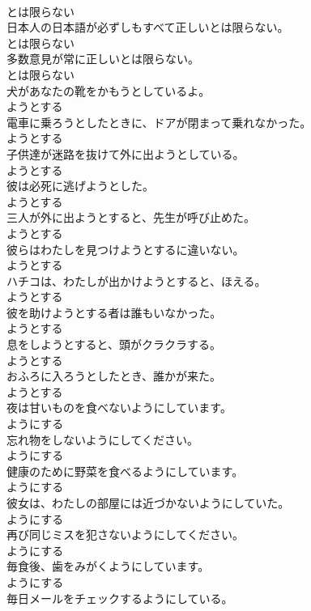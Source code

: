 \documentclass[8pt]{extreport}
\begin{document}
\begin{CJK}{UTF8}{min}
\\	とは限らない
\\	日本人の日本語が必ずしもすべて正しいとは限らない。	
\\	とは限らない
\\	多数意見が常に正しいとは限らない。	
\\	とは限らない
\\	犬があなたの靴をかもうとしているよ。	
\\	ようとする
\\	電車に乗ろうとしたときに、ドアが閉まって乗れなかった。	
\\	ようとする
\\	子供達が迷路を抜けて外に出ようとしている。	
\\	ようとする
\\	彼は必死に逃げようとした。	
\\	ようとする
\\	三人が外に出ようとすると、先生が呼び止めた。	
\\	ようとする
\\	彼らはわたしを見つけようとするに違いない。	
\\	ようとする
\\	ハチコは、わたしが出かけようとすると、ほえる。	
\\	ようとする
\\	彼を助けようとする者は誰もいなかった。	
\\	ようとする
\\	息をしようとすると、頭がクラクラする。	
\\	ようとする
\\	おふろに入ろうとしたとき、誰かが来た。	
\\	ようとする
\\	夜は甘いものを食べないようにしています。	
\\	ようにする
\\	忘れ物をしないようにしてください。	
\\	ようにする
\\	健康のために野菜を食べるようにしています。	
\\	ようにする
\\	彼女は、わたしの部屋には近づかないようにしていた。	
\\	ようにする
\\	再び同じミスを犯さないようにしてください。	
\\	ようにする
\\	毎食後、歯をみがくようにしています。	
\\	ようにする
\\	毎日メールをチェックするようにしている。	

\end{CJK}
\end{document}
